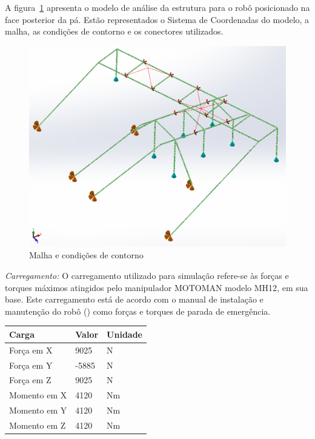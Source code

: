 A figura~\ref{fig::contorno} apresenta o modelo de análise da estrutura para o
robô posicionado na face posterior da pá. Estão representados o Sistema de
Coordenadas do modelo, a malha, as condições de contorno e os conectores
utilizados.

\begin{figure}[h!]
	\centering
	\includegraphics[width=0.9\columnwidth]{figs/dimensionamento/contorno}
	\caption{Malha e condições de contorno}
    \label{fig::contorno}
\end{figure}

\textit{Carregamento:} O carregamento utilizado para simulação
refere-se às forças e torques máximos atingidos pelo manipulador MOTOMAN modelo MH12, em
sua base. Este carregamento está de acordo com o manual de instalação e
manutenção do robô (\cite{MH12_manual}) como forças e torques de parada de
emergência.

\begin{center}
\centering
\begin{tabular}{|l|l|l|}
\hline
\textbf{Carga}		   & \textbf{Valor} & \textbf{Unidade}   \\ \hline
Força em X		       & 9025           & N	                 \\ \hline
Força em Y			   & -5885          & N                  \\ \hline
Força em Z			   & 9025           & N                  \\ \hline
Momento em X		   & 4120           & Nm                 \\ \hline
Momento em Y		   & 4120           & Nm                 \\ \hline
Momento em Z		   & 4120           & Nm                 \\ \hline
\end{tabular}
\label{tab::carregamento}
\end{center}

